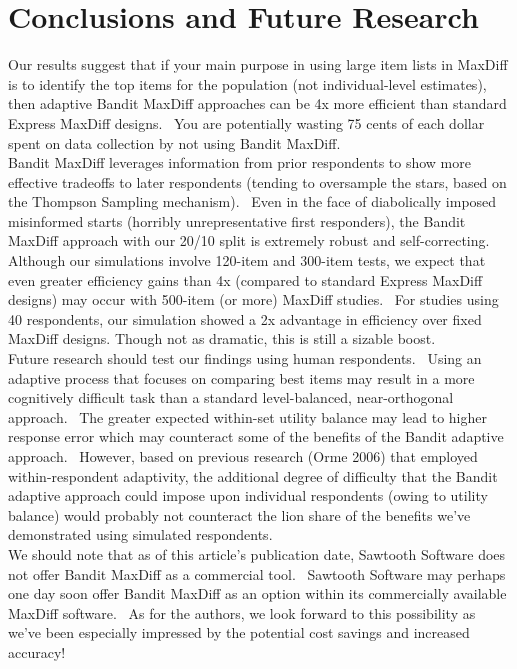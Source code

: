 \documentclass[mksc,blindrev]{informs3} %
\begin{document}
\section{Conclusions and Future Research}
Our results suggest that if your main purpose in using large item lists in MaxDiff is to identify the top items for the population (not individual-level estimates), then adaptive Bandit MaxDiff approaches can be 4x more efficient than standard Express MaxDiff designs.  You are potentially wasting 75 cents of each dollar spent on data collection by not using Bandit MaxDiff.\\
Bandit MaxDiff leverages information from prior respondents to show more effective tradeoffs to later respondents (tending to oversample the stars, based on the Thompson Sampling mechanism).  Even in the face of diabolically imposed misinformed starts (horribly unrepresentative first responders), the Bandit MaxDiff approach with our 20/10 split is extremely robust and self-correcting.\\
Although our simulations involve 120-item and 300-item tests, we expect that even greater efficiency gains than 4x (compared to standard Express MaxDiff designs) may occur with 500-item (or more) MaxDiff studies.  For studies using 40 respondents, our simulation showed a 2x advantage in efficiency over fixed MaxDiff designs. Though not as dramatic, this is still a sizable boost.\\
Future research should test our findings using human respondents.  Using an adaptive process that focuses on comparing best items may result in a more cognitively difficult task than a standard level-balanced, near-orthogonal approach.  The greater expected within-set utility balance may lead to higher response error which may counteract some of the benefits of the Bandit adaptive approach.  However, based on previous research (Orme 2006) that employed within-respondent adaptivity, the additional degree of difficulty that the Bandit adaptive approach could impose upon individual respondents (owing to utility balance) would probably not counteract the lion share of the benefits we’ve demonstrated using simulated respondents.\\
We should note that as of this article’s publication date, Sawtooth Software does not offer Bandit MaxDiff as a commercial tool.  Sawtooth Software may perhaps one day soon offer Bandit MaxDiff as an option within its commercially available MaxDiff software.  As for the authors, we look forward to this possibility as we’ve been especially impressed by the potential cost savings and increased accuracy!
\end{document}
